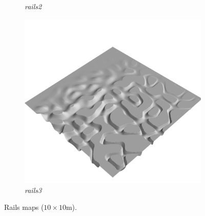 \documentclass[../document.tex]{subfiles}
\begin{document}
\begin{figure}[H]
\begin{subfigure}[b]{0.32\linewidth}
            \caption{\emph{rails2}}
            \end{subfigure}    
          \begin{subfigure}[b]{0.32\textwidth}
            \includegraphics[width=\textwidth]{../img/hm3d/rails3.png}
            \caption{\emph{rails3}}
        \end{subfigure}    
    \label{fig: heightmaps}
    \caption{Rails maps ($10\times10$m).}
\end{figure}
\end{document}

